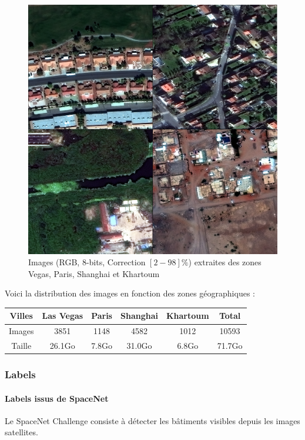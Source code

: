 \documentclass[a4paper, 11pt]{report}
\begin{document}
\begin{figure}[H]
	\begin{center}
		\includegraphics[scale=0.3]{Images/MUL_PAN.png}
		\caption{Images (RGB, 8-bits, Correction $[2-98]\%$) extraites des zones Vegas, Paris, Shanghai et Khartoum}
	\end{center}
\end{figure}

Voici la distribution des images en fonction des zones géographiques :
\begin{center}
	 \begin{tabular}{|c|c|c|c|c|c|}
	\hline 
	Villes & Las Vegas & Paris & Shanghai & Khartoum & Total \\ 
	\hline 
	Images & 3851 & 1148 & 4582 & 1012 & 10593 \\ 
	\hline 
	Taille & 26.1Go & 7.8Go & 31.0Go & 6.8Go & 71.7Go \\ 
	\hline 
	\end{tabular}
 \end{center} 
\subsubsection{Labels}
\paragraph{Labels issus de SpaceNet}
Le SpaceNet Challenge consiste à détecter les bâtiments visibles depuis les images satellites.
\end{document}
